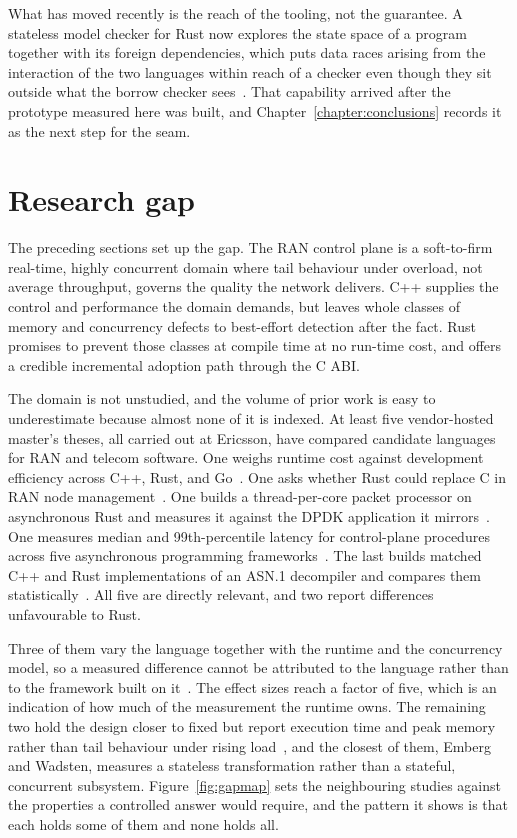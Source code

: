 \documentclass[english,oneside,a4paper,censored,csm,software-track-2020]{HYthesisML}
\begin{document}
What has moved recently is the reach of the tooling, not the guarantee. A stateless model
checker for Rust now explores the state space of a program together with its foreign
dependencies, which puts data races arising from the interaction of the two languages within
reach of a checker even though they sit outside what the borrow checker
sees~\cite{pearce2026rustmc}. That capability arrived after the prototype measured here was
built, and Chapter~\ref{chapter:conclusions} records it as the next step for the seam.

\section{Research gap}\label{sec:gap}
The preceding sections set up the gap. The RAN control plane is a soft-to-firm real-time,
highly concurrent domain where tail behaviour under overload, not average throughput, governs
the quality the network delivers. C++ supplies the control and performance the domain demands,
but leaves whole classes of memory and concurrency defects to best-effort detection after the
fact. Rust promises to prevent those classes at compile time at no run-time cost, and offers a
credible incremental adoption path through the C ABI.

The domain is not unstudied, and the volume of prior work is easy to underestimate because
almost none of it is indexed. At least five vendor-hosted master's theses, all carried out at
Ericsson, have compared candidate languages for RAN and telecom software. One weighs runtime
cost against development efficiency across C++, Rust, and Go~\cite{karlback2021ran}. One asks
whether Rust could replace C in RAN node management~\cite{olsson2023ranmgmt}. One builds a
thread-per-core packet processor on asynchronous Rust and measures it against the DPDK
application it mirrors~\cite{olsson2023asyncpackets}. One measures median and 99th-percentile
latency for control-plane procedures across five asynchronous programming
frameworks~\cite{arvidsson2025async}. The last builds matched C++ and Rust implementations of an
ASN.1 decompiler and compares them statistically~\cite{emberg2023asn1}. All five are directly
relevant, and two report differences unfavourable to Rust.

Three of them vary the language together with the runtime and the concurrency model, so a
measured difference cannot be attributed to the language rather than to the framework built on
it~\cite{karlback2021ran,olsson2023asyncpackets,arvidsson2025async}. The effect sizes reach a
factor of five, which is an indication of how much of the measurement the runtime owns. The
remaining two hold the design closer to fixed but report execution time and peak memory rather
than tail behaviour under rising load~\cite{olsson2023ranmgmt,emberg2023asn1}, and the closest
of them, Emberg and Wadsten, measures a stateless transformation rather than a stateful,
concurrent subsystem. Figure~\ref{fig:gapmap} sets the neighbouring studies against the
properties a controlled answer would require, and the pattern it shows is that each holds some
of them and none holds all.
\end{document}
